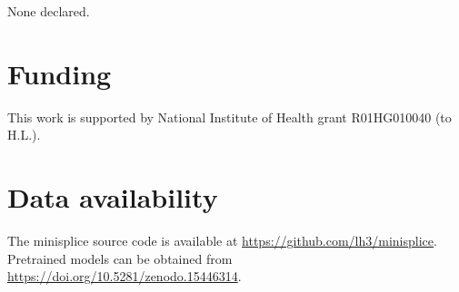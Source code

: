 \documentclass[webpdf,contemporary,large,namedate]{oup-authoring-template}%
\begin{document}
None declared.

\section*{Funding}

This work is supported by National Institute of Health grant R01HG010040 (to H.L.).

\section*{Data availability}

The minisplice source code is available at \url{https://github.com/lh3/minisplice}.
Pretrained models can be obtained from \url{https://doi.org/10.5281/zenodo.15446314}.


{\sffamily\small
}
\end{document}
